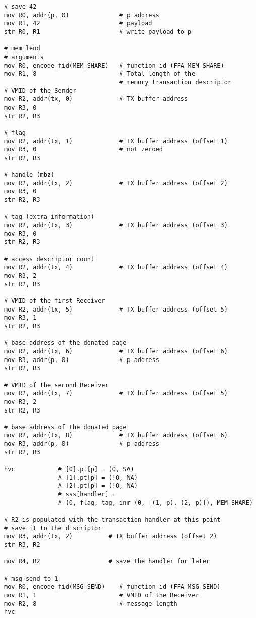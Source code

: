 \documentclass{article}
\begin{document}
\begin{lstlisting}[caption={VM 0}]
# save 42
mov R0, addr(p, 0)              # p address
mov R1, 42                      # payload
str R0, R1                      # write payload to p

# mem_lend
# arguments
mov R0, encode_fid(MEM_SHARE)   # function id (FFA_MEM_SHARE)
mov R1, 8                       # Total length of the  
                                # memory transaction descriptor
# VMID of the Sender 
mov R2, addr(tx, 0)             # TX buffer address                               
mov R3, 0
str R2, R3

# flag
mov R2, addr(tx, 1)             # TX buffer address (offset 1)                               
mov R3, 0                       # not zeroed
str R2, R3

# handle (mbz)
mov R2, addr(tx, 2)             # TX buffer address (offset 2)
mov R3, 0
str R2, R3

# tag (extra information)
mov R2, addr(tx, 3)             # TX buffer address (offset 3)
mov R3, 0
str R2, R3

# access descriptor count
mov R2, addr(tx, 4)             # TX buffer address (offset 4)
mov R3, 2
str R2, R3

# VMID of the first Receiver
mov R2, addr(tx, 5)             # TX buffer address (offset 5)
mov R3, 1
str R2, R3

# base address of the donated page
mov R2, addr(tx, 6)             # TX buffer address (offset 6)
mov R3, addr(p, 0)              # p address
str R2, R3

# VMID of the second Receiver
mov R2, addr(tx, 7)             # TX buffer address (offset 5)
mov R3, 2
str R2, R3

# base address of the donated page
mov R2, addr(tx, 8)             # TX buffer address (offset 6)
mov R3, addr(p, 0)              # p address
str R2, R3

hvc            # [0].pt[p] = (O, SA)
               # [1].pt[p] = (!O, NA)
               # [2].pt[p] = (!O, NA)
               # sss[handler] = 
               # (0, flag, tag, inr (0, [(1, p), (2, p)]), MEM_SHARE)

# R2 is populated with the transaction handler at this point
# save it to the discriptor
mov R3, addr(tx, 2)          # TX buffer address (offset 2)
str R3, R2

mov R4, R2                   # save the handler for later

# msg_send to 1
mov R0, encode_fid(MSG_SEND)    # function id (FFA_MSG_SEND)
mov R1, 1                       # VMID of the Receiver
mov R2, 8                       # message length
hvc


\end{lstlisting}
\end{document}
